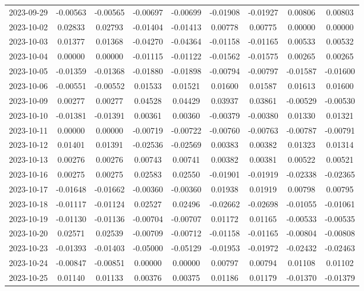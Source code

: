 {\begin{footnotesize}
\begin{longtable}{lcccccccc}
2023-09-29 & -0.00563 & -0.00565 & -0.00697 & -0.00699 & -0.01908 & -0.01927 & 0.00806 & 0.00803 \\
2023-10-02 & 0.02833 & 0.02793 & -0.01404 & -0.01413 & 0.00778 & 0.00775 & 0.00000 & 0.00000 \\
2023-10-03 & 0.01377 & 0.01368 & -0.04270 & -0.04364 & -0.01158 & -0.01165 & 0.00533 & 0.00532 \\
2023-10-04 & 0.00000 & 0.00000 & -0.01115 & -0.01122 & -0.01562 & -0.01575 & 0.00265 & 0.00265 \\
2023-10-05 & -0.01359 & -0.01368 & -0.01880 & -0.01898 & -0.00794 & -0.00797 & -0.01587 & -0.01600 \\
2023-10-06 & -0.00551 & -0.00552 & 0.01533 & 0.01521 & 0.01600 & 0.01587 & 0.01613 & 0.01600 \\
2023-10-09 & 0.00277 & 0.00277 & 0.04528 & 0.04429 & 0.03937 & 0.03861 & -0.00529 & -0.00530 \\
2023-10-10 & -0.01381 & -0.01391 & 0.00361 & 0.00360 & -0.00379 & -0.00380 & 0.01330 & 0.01321 \\
2023-10-11 & 0.00000 & 0.00000 & -0.00719 & -0.00722 & -0.00760 & -0.00763 & -0.00787 & -0.00791 \\
2023-10-12 & 0.01401 & 0.01391 & -0.02536 & -0.02569 & 0.00383 & 0.00382 & 0.01323 & 0.01314 \\
2023-10-13 & 0.00276 & 0.00276 & 0.00743 & 0.00741 & 0.00382 & 0.00381 & 0.00522 & 0.00521 \\
2023-10-16 & 0.00275 & 0.00275 & 0.02583 & 0.02550 & -0.01901 & -0.01919 & -0.02338 & -0.02365 \\
2023-10-17 & -0.01648 & -0.01662 & -0.00360 & -0.00360 & 0.01938 & 0.01919 & 0.00798 & 0.00795 \\
2023-10-18 & -0.01117 & -0.01124 & 0.02527 & 0.02496 & -0.02662 & -0.02698 & -0.01055 & -0.01061 \\
2023-10-19 & -0.01130 & -0.01136 & -0.00704 & -0.00707 & 0.01172 & 0.01165 & -0.00533 & -0.00535 \\
2023-10-20 & 0.02571 & 0.02539 & -0.00709 & -0.00712 & -0.01158 & -0.01165 & -0.00804 & -0.00808 \\
2023-10-23 & -0.01393 & -0.01403 & -0.05000 & -0.05129 & -0.01953 & -0.01972 & -0.02432 & -0.02463 \\
2023-10-24 & -0.00847 & -0.00851 & 0.00000 & 0.00000 & 0.00797 & 0.00794 & 0.01108 & 0.01102 \\
2023-10-25 & 0.01140 & 0.01133 & 0.00376 & 0.00375 & 0.01186 & 0.01179 & -0.01370 & -0.01379 \\

\end{longtable}
\end{footnotesize}}
